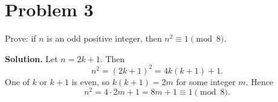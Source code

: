 \section*{Problem 3}

Prove: if $n$ is an odd positive integer, then $n^{2}\equiv 1 \pmod{8}$.

\textbf{Solution.}
Let $n=2k+1$. Then
\[
n^{2}=(2k+1)^{2}=4k(k+1)+1.
\]
One of $k$ or $k+1$ is even, so $k(k+1)=2m$ for some integer $m$. Hence
\[
n^{2}=4\cdot 2m+1=8m+1\equiv 1 \pmod{8}.
\]
